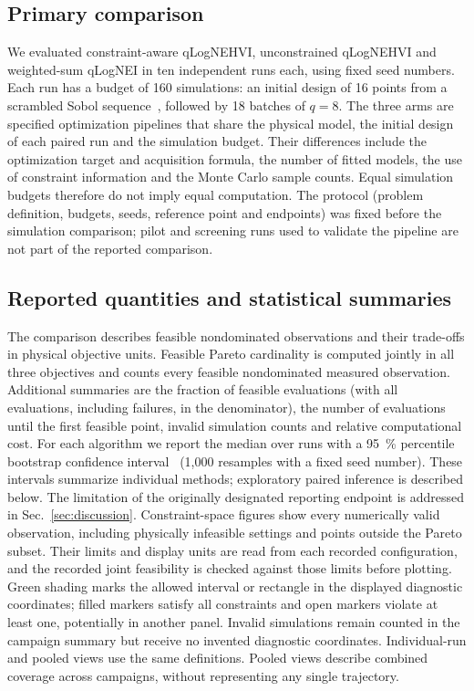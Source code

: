 \documentclass[aps,prab,reprint,superscriptaddress,amsmath,amssymb,floatfix]{revtex4-2}
\begin{document}
\subsection{Primary comparison}
We evaluated constraint-aware qLogNEHVI, unconstrained qLogNEHVI and weighted-sum qLogNEI in ten
independent runs each, using fixed seed numbers. Each run has a budget of 160 simulations:
an initial design of 16 points from a scrambled Sobol sequence~\cite{Owen1998}, followed by 18 batches
of $q = 8$. The three arms are specified optimization pipelines that share the physical
model, the initial design of each paired run and the simulation budget. Their differences include
the optimization target and acquisition formula, the number of fitted
models, the use of constraint information and the Monte Carlo sample counts. Equal simulation budgets
therefore do not imply equal computation. The protocol (problem
definition, budgets, seeds, reference point and endpoints) was fixed before the simulation comparison; pilot
and screening runs used to validate the pipeline are not part of the reported comparison.

\subsection{Reported quantities and statistical summaries}
\label{sec:endpoints}
The comparison describes feasible nondominated observations and their trade-offs in physical
objective units. Feasible Pareto cardinality is computed jointly in all three objectives and
counts every feasible nondominated measured observation. Additional summaries are the fraction
of feasible evaluations (with all evaluations, including failures, in the denominator), the
number of evaluations until the first feasible point, invalid simulation counts and relative
computational cost. For each algorithm we report the median over runs with a \SI{95}{\percent} percentile
bootstrap confidence interval~\cite{Efron1993} (1,000 resamples with a fixed seed number).
These intervals summarize individual methods; exploratory paired inference is described below.
The limitation of the originally designated reporting endpoint is addressed in
Sec.~\ref{sec:discussion}. Constraint-space figures show every numerically valid observation,
including physically
infeasible settings and points outside the Pareto subset. Their limits and
display units are read from each recorded configuration, and the recorded joint feasibility is
checked against those limits before plotting. Green shading marks the allowed interval or
rectangle in the displayed diagnostic coordinates; filled markers satisfy all constraints and
open markers violate at least one, potentially in another panel. Invalid simulations remain
counted in the campaign summary but receive no invented diagnostic coordinates. Individual-run and
pooled views use the same definitions. Pooled views describe combined
coverage across campaigns, without representing any single trajectory.
\end{document}
